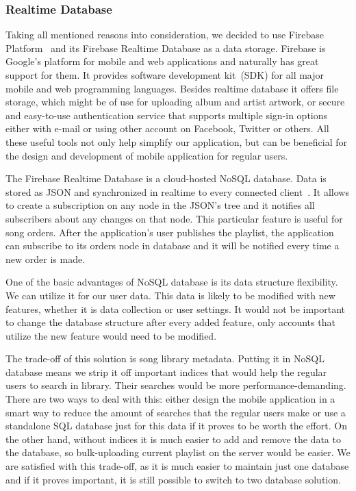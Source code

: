 \subsubsection{Realtime Database}

Taking all mentioned reasons into consideration, we decided to use Firebase Platform~\citep{firebase} and its Firebase Realtime Database as a data storage. Firebase is Google's platform for mobile and web applications and naturally has great support for them. It provides software development kit~(SDK) for all major mobile and web programming languages. Besides realtime database it offers file storage, which might be of use for uploading album and artist artwork, or secure and easy-to-use authentication service that supports multiple sign-in options either with e-mail or using other account on Facebook, Twitter or others. All these useful tools not only help simplify our application, but can be beneficial for the design and development of mobile application for regular users.
\par
The Firebase Realtime Database is a cloud-hosted NoSQL database. Data is stored as JSON and synchronized in realtime to every connected client~\citep{firebaseDocs}. It allows to create a subscription on any node in the JSON's tree and it notifies all subscribers about any changes on that node. This particular feature is useful for song orders. After the application's user publishes the playlist, the application can subscribe to its orders node in database and it will be notified every time a new order is made.
\par
One of the basic advantages of NoSQL database is its data structure flexibility. We can utilize it for our user data. This data is likely to be modified with new features, whether it is data collection or user settings. It would not be important to change the database structure after every added feature, only accounts that utilize the new feature would need to be modified.
\par
The trade-off of this solution is song library metadata. Putting it in NoSQL database means we strip it off important indices that would help the regular users to search in library. Their searches would be more performance-demanding. There are two ways to deal with this: either design the mobile application in a smart way to reduce the amount of searches that the regular users make or use a standalone SQL database just for this data if it proves to be worth the effort. On the other hand, without indices it is much easier to add and remove the data to the database, so bulk-uploading current playlist on the server would be easier. We are satisfied with this trade-off, as it is much easier to maintain just one database and if it proves important, it is still possible to switch to two database solution.


